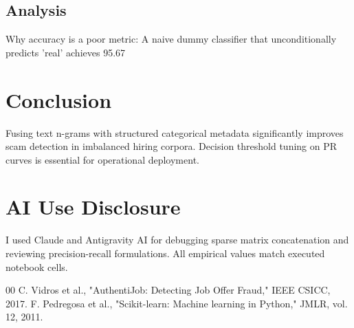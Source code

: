 \documentclass[conference]{IEEEtran}
\begin{document}
\subsection{Analysis}
Why accuracy is a poor metric: A naive dummy classifier that unconditionally predicts 'real' achieves 95.67%

\section{Conclusion}
Fusing text n-grams with structured categorical metadata significantly improves scam detection in imbalanced hiring corpora. Decision threshold tuning on PR curves is essential for operational deployment.

\section*{AI Use Disclosure}
I used Claude and Antigravity AI for debugging sparse matrix concatenation and reviewing precision-recall formulations. All empirical values match executed notebook cells.

\begin{thebibliography}{00}
 C. Vidros et al., "AuthentiJob: Detecting Job Offer Fraud," IEEE CSICC, 2017.
 F. Pedregosa et al., "Scikit-learn: Machine learning in Python," JMLR, vol. 12, 2011.
\end{thebibliography}
\end{document}
